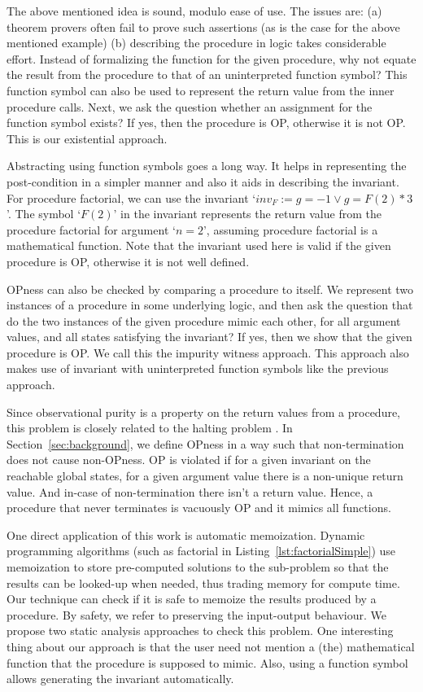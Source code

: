 \documentclass{llncs}
\newcommand{\inv}{\mathit{inv}}
\newcommand{\F}{\mathit{F}}
\begin{document}
The above mentioned idea is sound, modulo ease of use. The issues are:
(a) theorem provers often fail to prove such assertions (as is the
case for the above mentioned example) (b) describing the procedure in
logic takes considerable effort.  Instead of formalizing the function
for the given procedure, why not equate the result from the procedure
to that of an uninterpreted function symbol? This function symbol can
also be used to represent the return value from the inner procedure
calls. Next, we ask the question whether an assignment for the
function symbol exists? If yes, then the procedure is OP, otherwise it
is not OP.  This is our existential approach.

Abstracting using function symbols goes a long way. It helps in
representing the post-condition in a simpler manner and also it aids
in describing the invariant. For procedure factorial, we can use
the invariant `$\inv_{\F}:=g = -1 \vee g = \F(2) * 3$'. The symbol
`$\F(2)$' in the invariant represents the return value from the
procedure factorial for argument `$n = 2$', assuming procedure
factorial is a mathematical function. Note that the invariant used
here is valid if the given procedure is OP, otherwise it is not well
defined.


OPness can also be checked by comparing a procedure to itself. We
represent two instances of a procedure in some underlying logic, and
then ask the question that do the two instances of the given procedure
mimic each other, for all argument values, and all states satisfying
the invariant? If yes, then we show that the given procedure is OP. We
call this the impurity witness approach.  This approach also makes
use of invariant with uninterpreted function symbols like the previous
approach.

Since observational purity is a property on the return values from a
procedure, this problem is closely related to the halting problem
. In Section~\ref{sec:background}, we define OPness in a way such that
non-termination does not cause non-OPness. OP is violated if for a
given invariant on the reachable global states, for a given argument
value there is a non-unique return value. And in-case of
non-termination there isn't a return value. Hence, a procedure that
never terminates is vacuously OP and it mimics all functions.

One direct application of this work is automatic memoization. Dynamic
programming algorithms (such as factorial in
Listing~\ref{lst:factorialSimple}) use memoization to store
pre-computed solutions to the sub-problem so that the results can be
looked-up when needed, thus trading memory for compute time. Our
technique can check if it is safe to memoize the results produced by a
procedure. By safety, we refer to preserving the input-output
behaviour. We propose two static analysis approaches to check this
problem. One interesting thing about our approach is that the user
need not mention a (the) mathematical function that the procedure is
supposed to mimic. Also, using a function symbol allows generating the
invariant automatically.
\end{document}
